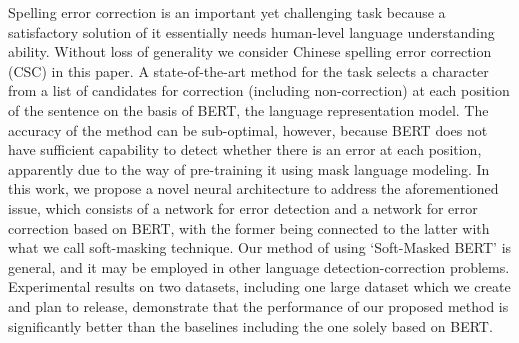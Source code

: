 Spelling error correction is an important yet challenging task because a satisfactory solution of it essentially needs human-level language understanding ability. Without loss of generality we consider Chinese spelling error correction (CSC) in this paper. A state-of-the-art method for the task selects a character from a list of candidates for correction (including non-correction) at each position of the sentence on the basis of BERT, the language representation model. The accuracy of the method can be sub-optimal, however, because BERT does not have sufficient capability to detect whether there is an error at each position, apparently due to the way of pre-training it using mask language modeling. In this work, we propose a novel neural architecture to address the aforementioned issue, which consists of a network for error detection and a network for error correction based on BERT, with the former being connected to the latter with what we call soft-masking technique. Our method of using `Soft-Masked BERT' is general, and it may be employed in other language detection-correction problems. Experimental results on two datasets, including one large dataset which we create and plan to release, demonstrate that the performance of our proposed method is significantly better than the baselines including the one solely based on BERT.
